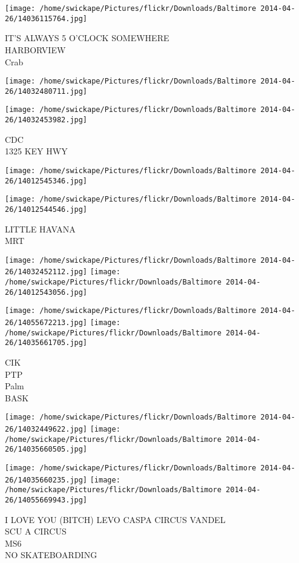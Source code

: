 \documentclass[10pt,letterpaper]{article}
\begin{document}
\texttt{[image: /home/swickape/Pictures/flickr/Downloads/Baltimore 2014-04-26/14036115764.jpg]}

IT'S ALWAYS 5 O'CLOCK SOMEWHERE\\
HARBORVIEW\\
Crab
\pagebreak

\texttt{[image: /home/swickape/Pictures/flickr/Downloads/Baltimore 2014-04-26/14032480711.jpg]}

\vspace{0.25in}
\texttt{[image: /home/swickape/Pictures/flickr/Downloads/Baltimore 2014-04-26/14032453982.jpg]}

CDC\\
1325 KEY HWY
\pagebreak

\texttt{[image: /home/swickape/Pictures/flickr/Downloads/Baltimore 2014-04-26/14012545346.jpg]}

\vspace{0.25in}
\texttt{[image: /home/swickape/Pictures/flickr/Downloads/Baltimore 2014-04-26/14012544546.jpg]}

LITTLE HAVANA\\
MRT
\pagebreak

\texttt{[image: /home/swickape/Pictures/flickr/Downloads/Baltimore 2014-04-26/14032452112.jpg]}
\texttt{[image: /home/swickape/Pictures/flickr/Downloads/Baltimore 2014-04-26/14012543056.jpg]}

\texttt{[image: /home/swickape/Pictures/flickr/Downloads/Baltimore 2014-04-26/14055672213.jpg]}
\texttt{[image: /home/swickape/Pictures/flickr/Downloads/Baltimore 2014-04-26/14035661705.jpg]}

CIK\\
PTP\\
Palm\\
BASK
\pagebreak

\texttt{[image: /home/swickape/Pictures/flickr/Downloads/Baltimore 2014-04-26/14032449622.jpg]}
\texttt{[image: /home/swickape/Pictures/flickr/Downloads/Baltimore 2014-04-26/14035660505.jpg]}

\texttt{[image: /home/swickape/Pictures/flickr/Downloads/Baltimore 2014-04-26/14035660235.jpg]}
\texttt{[image: /home/swickape/Pictures/flickr/Downloads/Baltimore 2014-04-26/14055669943.jpg]}

I LOVE YOU (BITCH) LEVO CASPA CIRCUS VANDEL\\
SCU A CIRCUS\\
MS6\\
NO SKATEBOARDING
\pagebreak
\end{document}
